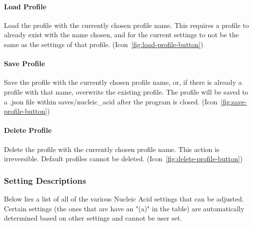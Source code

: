 \documentclass[titlepage]{article}
\begin{document}
	\paragraph{Load Profile}
	Load the profile with the currently chosen profile name. This requires a profile to already exist with the name chosen, and for the current settings to not be the same as the settings of that profile. (Icon~\ref{fig:load-profile-button})
	
	\paragraph{Save Profile}
	Save the profile with the currently chosen profile name, or, if there is already a profile with that name, overwrite the existing profile. The profile will be saved to a .json file within saves/nucleic\_acid after the program is closed. (Icon~\ref{fig:save-profile-button})
	
	\paragraph{Delete Profile}
	Delete the profile with the currently chosen profile name. This action is irreversible. Default profiles cannot be deleted. (Icon~\ref{fig:delete-profile-button})

	\subsubsection{Setting Descriptions}
	Below lies a list of all of the various Nucleic Acid settings that can be adjusted. Certain settings (the ones that are have an "(a)" in the table) are automatically determined based on other settings and cannot be user set.
\end{document}
